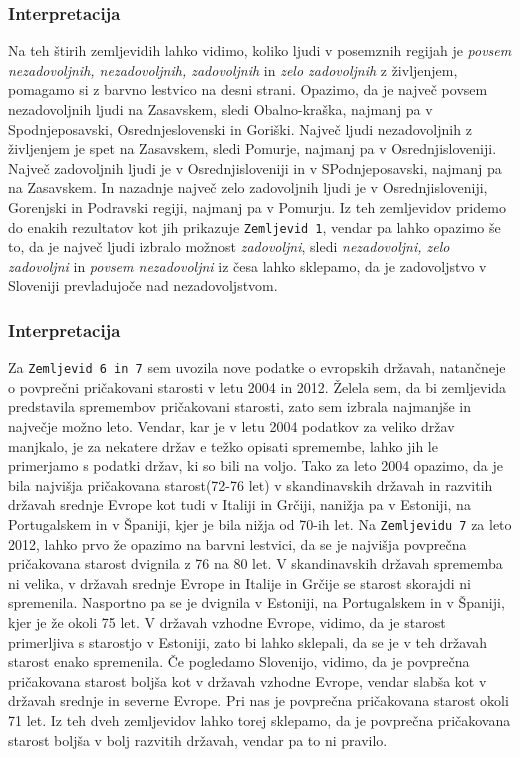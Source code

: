 \documentclass[11pt,a4paper]{article}
\begin{document}
\subsubsection{Interpretacija}
Na teh štirih zemljevidih lahko vidimo, koliko ljudi v posemznih regijah je \textit{povsem nezadovoljnih, nezadovoljnih, zadovoljnih} in \textit{zelo zadovoljnih} z življenjem, pomagamo si z barvno lestvico na desni strani. Opazimo, da je največ povsem nezadovoljnih ljudi na Zasavskem, sledi Obalno-kraška, najmanj pa v Spodnjeposavski, Osrednjeslovenski in Goriški. Največ ljudi nezadovoljnih z življenjem je spet na Zasavskem, sledi Pomurje, najmanj pa v Osrednjisloveniji. Največ zadovoljnih ljudi je v Osrednjisloveniji in v SPodnjeposavski, najmanj pa na Zasavskem. In nazadnje največ zelo zadovoljnih ljudi je v Osrednjisloveniji, Gorenjski in Podravski regiji, najmanj pa v Pomurju. Iz teh zemljevidov pridemo do enakih rezultatov kot jih prikazuje \verb+Zemljevid 1+, vendar pa lahko opazimo še to, da je največ ljudi izbralo možnost \textit{zadovoljni}, sledi \textit{nezadovoljni, zelo zadovoljni} in \textit{povsem nezadovoljni} iz česa lahko sklepamo, da je zadovoljstvo v Sloveniji prevladujoče nad nezadovoljstvom.

\subsubsection{Interpretacija}
Za \verb+Zemljevid 6 in 7+ sem uvozila nove podatke o evropskih državah, natančneje o povprečni pričakovani starosti v letu 2004 in 2012. Želela sem, da bi zemljevida predstavila spremembov pričakovani starosti, zato sem izbrala najmanjše in največje možno leto. Vendar, kar je v letu 2004 podatkov za veliko držav manjkalo, je za nekatere držav e težko opisati spremembe, lahko jih le primerjamo s podatki držav, ki so bili na voljo. Tako za leto 2004 opazimo, da je bila najvišja pričakovana starost(72-76 let) v skandinavskih državah in razvitih državah srednje Evrope kot tudi v Italiji in Grčiji, nanižja pa v Estoniji, na Portugalskem in v Španiji, kjer je bila nižja od 70-ih let. Na \verb+Zemljevidu 7+ za leto 2012, lahko prvo že opazimo na barvni lestvici, da se je najvišja povprečna pričakovana starost dvignila z 76 na 80 let. V skandinavskih državah sprememba ni velika, v državah srednje Evrope in Italije in Grčije se starost skorajdi ni spremenila. Nasportno pa se je dvignila v Estoniji, na Portugalskem in v Španiji, kjer je že okoli 75 let. V državah vzhodne Evrope, vidimo, da je starost primerljiva s starostjo v Estoniji, zato bi lahko sklepali, da se je v teh državah starost enako spremenila. Če pogledamo Slovenijo, vidimo, da je povprečna pričakovana starost boljša kot v državah vzhodne Evrope, vendar slabša kot v državah srednje in severne Evrope. Pri nas je povprečna pričakovana starost okoli 71 let. Iz teh dveh zemljevidov lahko torej sklepamo, da je povprečna pričakovana starost boljša v bolj razvitih državah, vendar pa to ni pravilo.
\end{document}
